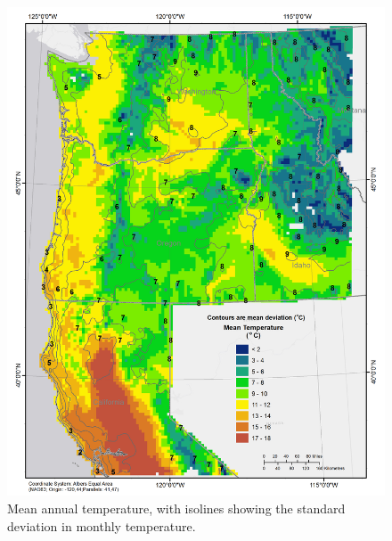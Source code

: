\documentclass[preprint,12pt]{elsarticle}
\begin{document}
\begin{figure}[hp]
  \centering  
  \includegraphics[width=1\linewidth]{temp}  
\caption{Mean annual temperature, with isolines showing the standard deviation in monthly temperature.}
  \label{fig:temp}
\end{figure}
\end{document}

